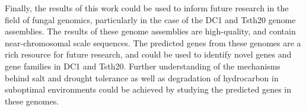 Finally, the results of this work could be used to inform future
research in the field of fungal genomics, particularly in the case of
the DC1 and Tsth20 genome assemblies. The results of these genome
assemblies are high-quality, and contain near-chromosomal scale
sequences. The predicted genes from these genomes are a rich resource
for future research, and could be used to identify novel genes and
gene families in DC1 and Tsth20. Further understanding of the
mechanisms behind salt and drought tolerance as well as degradation of
hydrocarbon in suboptimal environments could be achieved by studying
the predicted genes in these genomes.
